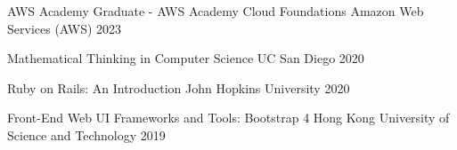 

\begin{cvhonors}

  \cvhonor
    {AWS Academy Graduate - AWS Academy Cloud Foundations} %
    {Amazon Web Services (AWS)} %
    {} %
    {2023} %
  
  \cvhonor
    {Mathematical Thinking in Computer Science} %
    {UC San Diego} %
    {} %
    {2020} %

  \cvhonor
    {Ruby on Rails: An Introduction} %
    {John Hopkins University} %
    {} %
    {2020} %

  \cvhonor
    {Front-End Web UI Frameworks and Tools: Bootstrap 4} %
    {Hong Kong University of Science and Technology} %
    {} %
    {2019} %
\end{cvhonors}